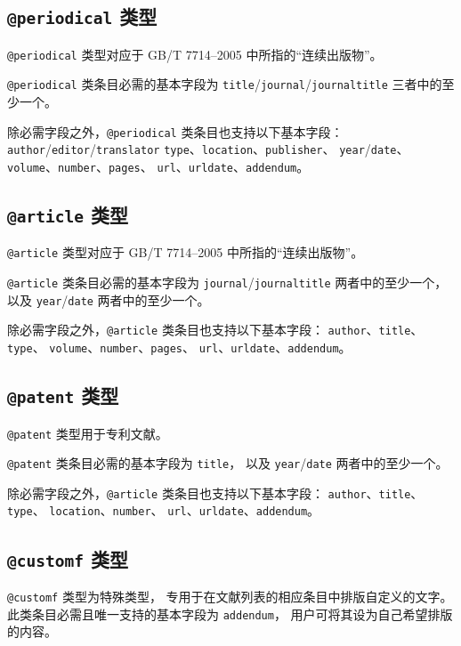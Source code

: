 \documentclass[UTF8, fancyhdr, hyperref]{ctexart}
\begin{document}
\subsection{\texttt{@periodical} 类型}

\verb|@periodical| 类型对应于 GB/T 7714--2005 中所指的“连续出版物”。

\verb|@periodical| 类条目必需的基本字段为
\verb|title|/\verb|journal|/\verb|journaltitle| 三者中的至少一个。

除必需字段之外，\verb|@periodical| 类条目也支持以下基本字段：
\verb|author|/\verb|editor|/\verb|translator| 
\verb|type|、\verb|location|、\verb|publisher|、
\verb|year|/\verb|date|、\verb|volume|、\verb|number|、\verb|pages|、
\verb|url|、\verb|urldate|、\verb|addendum|。

\subsection{\texttt{@article} 类型}

\verb|@article| 类型对应于 GB/T 7714--2005 中所指的“连续出版物”。

\verb|@article| 类条目必需的基本字段为
\verb|journal|/\verb|journaltitle| 两者中的至少一个，
以及 \verb|year|/\verb|date| 两者中的至少一个。

除必需字段之外，\verb|@article| 类条目也支持以下基本字段：
\verb|author|、\verb|title|、\verb|type|、
\verb|volume|、\verb|number|、\verb|pages|、
\verb|url|、\verb|urldate|、\verb|addendum|。

\subsection{\texttt{@patent} 类型}

\verb|@patent| 类型用于专利文献。

\verb|@patent| 类条目必需的基本字段为 \verb|title|，
以及 \verb|year|/\verb|date| 两者中的至少一个。

除必需字段之外，\verb|@article| 类条目也支持以下基本字段：
\verb|author|、\verb|title|、\verb|type|、
\verb|location|、\verb|number|、
\verb|url|、\verb|urldate|、\verb|addendum|。

\subsection{\texttt{@customf} 类型}

\verb|@customf| 类型为特殊类型，
专用于在文献列表的相应条目中排版自定义的文字。
此类条目必需且唯一支持的基本字段为 \verb|addendum|，
用户可将其设为自己希望排版的内容。
\end{document}
